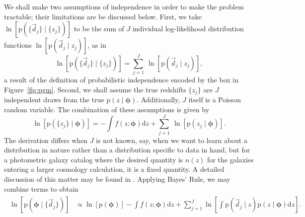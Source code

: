 \documentclass[iop]{emulateapj}
\newcommand{\Sect}[1]{Section~\ref{#1}}
\newcommand{\Eq}[1]{Equation~\ref{#1}}
\newcommand{\Fig}[1]{Figure~\ref{#1}}
\newcommand{\data}{\ensuremath{\vec{d}}}%
\newcommand{\pr}[1]{\ensuremath{\mathrm{p}(#1)}}%
\newcommand{\gvn}{\mid}%
\newcommand{\integral}[2]{\ensuremath{\int #1 \mathrm{d} #2}}
\newcommand{\bvec}[1]{\ensuremath{\boldsymbol{#1}}}%
\newcommand{\ndphi}{\bvec{\phi}}
\begin{document}
We shall make two assumptions of independence in order to make the problem tractable; their limitations are be discussed below.
First, we take $\ln[\pr{\{\data_{j}\} \gvn \{z_{j}\}}]$ to be the sum of $J$ individual log-likelihood distribution functions $\ln[\pr{\data_{j} \gvn z_{j}}]$, as in
\begin{equation}
\label{eqn:indiedat}
\ln[\pr{\{\data_{j}\} \gvn \{z_{j}\}}] = \sum_{j=1}^{J}\ \ln[\pr{\data_{j} \gvn z_{j}}],
\end{equation}
a result of the definition of probabilistic independence encoded by the box in \Fig{fig:pgm}.
Second, we shall assume the true redshifts $\{z_{j}\}$ are $J$ independent draws from the true $\pr{z \gvn \ndphi}$.
Additionally, $J$ itself is a Poisson random variable.
The combination of these assumptions is given by
\begin{equation}
\label{eqn:indie}
\ln[\pr{\{z_{j}\} \gvn \ndphi}] = -\integral{f(z; \ndphi)}{z} + \sum_{j=1}^{J}\ \ln[\pr{z_{j} \gvn \ndphi}].
\end{equation}
The derivation differs when $J$ is not known, say, when we want to learn about a distribution in nature rather than a distribution specific to data in hand, but for a photometric galaxy catalog where the desired quantity is $n(z)$ for the galaxies entering a larger cosmology calculation, it is a fixed quantity.
A detailed discussion of this matter may be found in \citet{foreman-mackey_exoplanet_2014}.
Applying Bayes' Rule, we may combine terms to obtain
\begin{align}
\begin{split}
\label{eqn:posterior}
\ln[\pr{\ndphi \gvn \{\data_{j}\}}] & \propto \ln[\pr{\ndphi}] - \integral{f(z; \ndphi)}{z} + \sum_{j=1}^{J}\ln\left[\integral{\pr{\data_{j} \gvn z} \pr{z \gvn \ndphi}}{z}\right].
\end{split}
\end{align}

\end{document}

